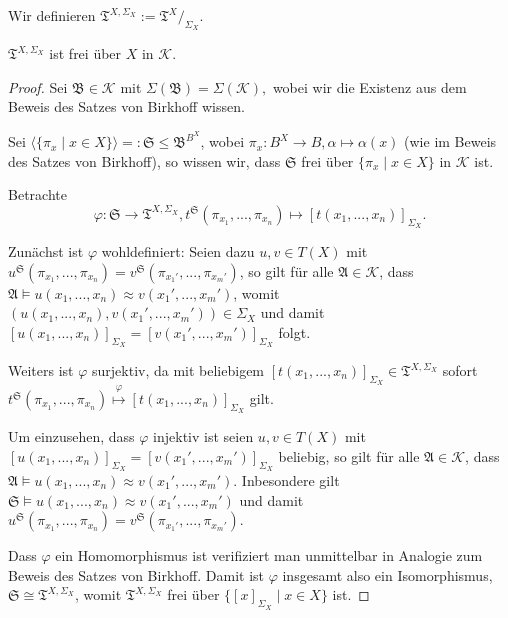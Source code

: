 \begin{definition}
    Wir definieren $ \mathfrak{T}^{X, \Sigma_X} := \mathfrak{T}^X /_{\Sigma_X}$.
\end{definition}

\begin{theorem}\label{theorem:freie_faktoralgebra}
    $\mathfrak{T}^{X, \Sigma_X}$ ist frei über $X$ in $\mathcal{K}$.
\end{theorem}

\begin{proof}
    Sei $\mathfrak{B} \in \mathcal{K}$ mit $\Sigma(\mathfrak{B}) = \Sigma(\mathcal{K}),$
    wobei wir die Existenz aus dem Beweis des Satzes von Birkhoff wissen.
    
    Sei $\langle \{ \pi_x \mid x \in X \} \rangle =: \mathfrak{S} \leq \mathfrak{B}^{B^X}$, wobei $\pi_x : B^X \to B, \alpha \mapsto \alpha(x)$ (wie im Beweis des Satzes von Birkhoff), so wissen wir, dass $\mathfrak{S}$ frei über $\{ \pi_x \mid x \in X \}$ in $\mathcal{K}$ ist.

    Betrachte
    $$ \varphi: \mathfrak{S} \to \mathfrak{T}^{X, \Sigma_X}, t^\mathfrak{S} (\pi_{x_1}, ..., \pi_{x_n}) \mapsto [t(x_1,...,x_n)]_{\Sigma_X}. $$

    Zunächst ist $\varphi$ wohldefiniert: Seien dazu $u, v \in T(X)$ mit $u^\mathfrak{S} (\pi_{x_1}, ..., \pi_{x_n}) = v^\mathfrak{S}(\pi_{x_1'}, ..., \pi_{x_m'})$, so gilt für alle $\mathfrak{A} \in \mathcal{K}$, dass $\mathfrak{A} \models u(x_1, ..., x_n) \approx v(x_1', ..., x_m')$, womit $(u(x_1, ..., x_n), v(x_1', ..., x_m')) \in \Sigma_X$ und damit $[u(x_1, ..., x_n)]_{\Sigma_X} = [v(x_1', ..., x_m')]_{\Sigma_X}$ folgt.

    Weiters ist $\varphi$ surjektiv, da mit beliebigem $[t(x_1,...,x_n)]_{\Sigma_X} \in \mathfrak{T}^{X, \Sigma_X}$ sofort \\ $t^\mathfrak{S}(\pi_{x_1}, ..., \pi_{x_n}) \overset{\varphi}{\mapsto} [t(x_1,...,x_n)]_{\Sigma_X}$ gilt.

    Um einzusehen, dass $\varphi$ injektiv ist seien $u, v \in T(X)$ mit $[u(x_1, ..., x_n)]_{\Sigma_X} = [v(x_1', ..., x_m')]_{\Sigma_X}$ beliebig, so gilt für alle $\mathfrak{A} \in \mathcal{K}$, dass $\mathfrak{A} \models u(x_1, ..., x_n) \approx v(x_1', ..., x_m')$. Inbesondere gilt $\mathfrak{S} \models u(x_1, ..., x_n) \approx v(x_1', ..., x_m')$ und damit $u^\mathfrak{S}(\pi_{x_1}, ..., \pi_{x_n}) = v^\mathfrak{S}(\pi_{x_1'}, ..., \pi_{x_m'})$.

    Dass $\varphi$ ein Homomorphismus ist verifiziert man unmittelbar in Analogie zum Beweis des Satzes von Birkhoff. Damit ist $\varphi$ insgesamt also ein Isomorphismus, $\mathfrak{S} \cong \mathfrak{T}^{X, \Sigma_X}$, womit $\mathfrak{T}^{X, \Sigma_X}$ frei über $\{ [x]_{\Sigma_X} \mid x \in X \}$ ist.
\end{proof}

